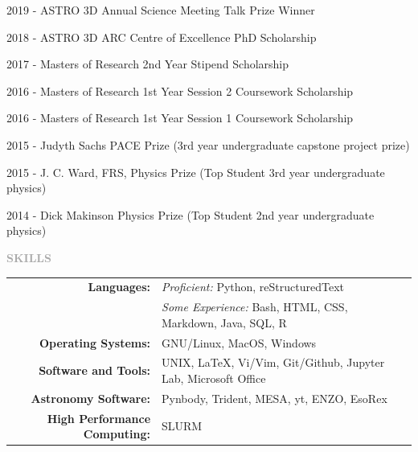 \documentclass[11pt]{extarticle}
\def\Vhrulefill{{\color{BurntOrange}{\leavevmode\leaders\hrule height 1.2ex depth \dimexpr0.5pt-0.9ex\hfill\kern5pt}}}
\begin{document}
2019 - ASTRO 3D Annual Science Meeting Talk Prize Winner \par
2018 - ASTRO 3D ARC Centre of Excellence PhD Scholarship \par
2017 - Masters of Research 2nd Year Stipend Scholarship \par
2016 - Masters of Research 1st Year Session 2 Coursework Scholarship  \par
2016 - Masters of Research 1st Year Session 1 Coursework Scholarship  \par
2015 - Judyth Sachs PACE Prize (3rd year undergraduate capstone project prize)  \par
2015 - J. C. Ward, FRS, Physics Prize (Top Student 3rd year undergraduate physics) \par 
2014 - Dick Makinson Physics Prize  (Top Student 2nd year undergraduate physics) \par 















\vspace{3ex}
\noindent
\textcolor{darkgray}{\Large\normalfont\bfseries\MakeUppercase{Skills}} \Vhrulefill
\vspace{2ex} 

\noindent
\begin{tabular}{rl}
\textbf{Languages:} & \emph{Proficient:} Python, reStructuredText \\
& \emph{Some Experience:} Bash, HTML, CSS, Markdown, Java, SQL, R \\
\textbf{Operating Systems:} & GNU/Linux, MacOS, Windows\\
\textbf{Software and Tools:} & UNIX, \LaTeX, Vi/Vim, Git/Github, Jupyter Lab, Microsoft Office \\
\textbf{Astronomy Software:} & Pynbody, Trident, MESA, yt, ENZO, EsoRex  \\
\textbf{High Performance Computing:} & SLURM
\end{tabular}
\end{document}
